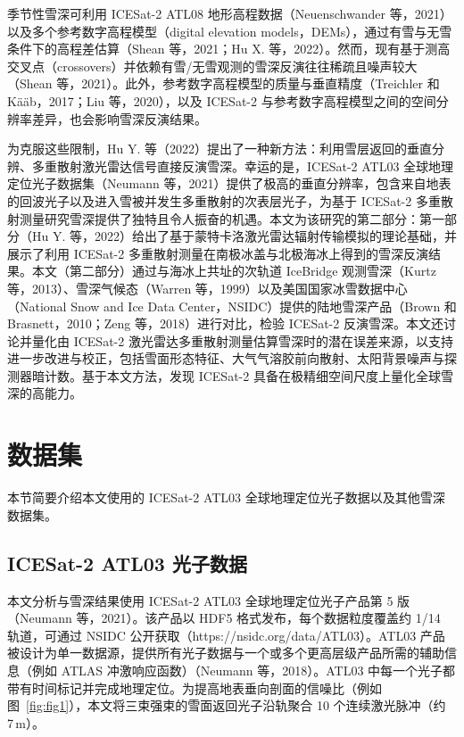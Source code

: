 季节性雪深可利用 ICESat-2 ATL08 地形高程数据（Neuenschwander 等，2021）以及多个参考数字高程模型（digital elevation models，DEMs），通过有雪与无雪条件下的高程差估算（Shean 等，2021；Hu X. 等，2022）。然而，现有基于测高交叉点（crossovers）并依赖有雪/无雪观测的雪深反演往往稀疏且噪声较大（Shean 等，2021）。此外，参考数字高程模型的质量与垂直精度（Treichler 和 Kääb，2017；Liu 等，2020），以及 ICESat-2 与参考数字高程模型之间的空间分辨率差异，也会影响雪深反演结果。

为克服这些限制，Hu Y. 等（2022）提出了一种新方法：利用雪层返回的垂直分辨、多重散射激光雷达信号直接反演雪深。幸运的是，ICESat-2 ATL03 全球地理定位光子数据集（Neumann 等，2021）提供了极高的垂直分辨率，包含来自地表的回波光子以及进入雪被并发生多重散射的次表层光子，为基于 ICESat-2 多重散射测量研究雪深提供了独特且令人振奋的机遇。本文为该研究的第二部分：第一部分（Hu Y. 等，2022）给出了基于蒙特卡洛激光雷达辐射传输模拟的理论基础，并展示了利用 ICESat-2 多重散射测量在南极冰盖与北极海冰上得到的雪深反演结果。本文（第二部分）通过与海冰上共址的次轨道 IceBridge 观测雪深（Kurtz 等，2013）、雪深气候态（Warren 等，1999）以及美国国家冰雪数据中心（National Snow and Ice Data Center，NSIDC）提供的陆地雪深产品（Brown 和 Brasnett，2010；Zeng 等，2018）进行对比，检验 ICESat-2 反演雪深。本文还讨论并量化由 ICESat-2 激光雷达多重散射测量估算雪深时的潜在误差来源，以支持进一步改进与校正，包括雪面形态特征、大气气溶胶前向散射、太阳背景噪声与探测器暗计数。基于本文方法，发现 ICESat-2 具备在极精细空间尺度上量化全球雪深的高能力。

\section{数据集}
本节简要介绍本文使用的 ICESat-2 ATL03 全球地理定位光子数据以及其他雪深数据集。

\subsection{ICESat-2 ATL03 光子数据}
本文分析与雪深结果使用 ICESat-2 ATL03 全球地理定位光子产品第 5 版（Neumann 等，2021）。该产品以 HDF5 格式发布，每个数据粒度覆盖约 1/14 轨道，可通过 NSIDC 公开获取（https://nsidc.org/data/ATL03）。ATL03 产品被设计为单一数据源，提供所有光子数据与一个或多个更高层级产品所需的辅助信息（例如 ATLAS 冲激响应函数）（Neumann 等，2018）。ATL03 中每一个光子都带有时间标记并完成地理定位。为提高地表垂向剖面的信噪比（例如图~\ref{fig:fig1}），本文将三束强束的雪面返回光子沿轨聚合 10 个连续激光脉冲（约 7\,m）。

